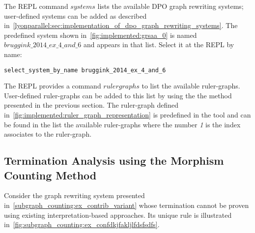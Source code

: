 The REPL command \colorbox{Ivory2}{$systems$} lists the available DPO graph rewriting systems; user-defined systems can be added as described in~\autoref{lyonparallel:sec:implementation_of_dpo_graph_rewriting_systems}. The predefined system shown in~\autoref{fig:implemented:grsaa_0} is named \colorbox{Ivory2}{$bruggink\_2014\_ex\_4\_and\_6$} and appears in that list. Select it at the REPL by name:
\begin{verbatim}
select_system_by_name bruggink_2014_ex_4_and_6
\end{verbatim}

The REPL provides a command \colorbox{Ivory2}{$rulergraphs$} to list the available ruler-graphs. User-defined ruler-graphs can be added to this list by using the the method presented in the previous section. The ruler-graph defined in~\autoref{fig:implemented:ruler_graph_representation} is predefined in the tool and can be found in the list the available ruler-graphs where the number \textit{1} is the index associates to the ruler-graph.

\subsection{Termination Analysis using the Morphism Counting Method}
Consider the graph rewriting system presented in~\autoref{subgraph_counting:ex_contrib_variant} whose termination cannot be proven using existing interpretation-based approaches. Its unique rule is illustrated in~\autoref{fig:subgraph_counting:ex_confdkjfakljlfdsfsdfs}.
 
